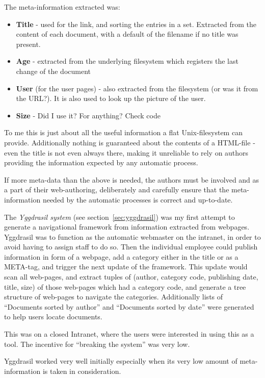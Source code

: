 The meta-information extracted was:

\begin{itemize}
\item \textbf{Title} - used for the link, and sorting the entries in a
  set.  Extracted from the content of each document, with a default of
  the filename if no title was present.
\item \textbf{Age} - extracted from the underlying filesystem which
  registers the last change of the document
\item \textbf{User} (for the user pages) - also extracted from the
  filesystem (\textsf{or was it from the URL?}).  It is also used to
  look up the picture of the user.
\item \textbf{Size} - \textsf{Did I use it?  For anything?  Check code}
\end{itemize}

To me this is just about all the useful information a flat
Unix-filesystem can provide.  Additionally nothing is guaranteed about
the contents of a HTML-file - even the title is not even always
there, making it unreliable to rely on authors providing the
information expected by any automatic process.

If more meta-data than the above is needed, the authors must be
involved and as a part of their web-authoring, deliberately and
carefully ensure that the meta-information needed by the automatic
processes is correct and up-to-date.

The \textit{Yggdrasil system} (see section~\vref{sec:yggdrasil}) was
my first attempt to generate a navigational framework from information
extracted from webpages.  Yggdrasil was to function as the automatic
webmaster on the intranet, in order to avoid having to assign staff to
do so.  Then the individual employee could publish information in form
of a webpage, add a category either in the title or as a META-tag, and
trigger the next update of the framework.  This update would scan all
web-pages, and extract tuples of (author, category code, publishing
date, title, size) of those web-pages which had a category code, and
generate a tree structure of web-pages to navigate the categories.
Additionally lists of ``Documents sorted by author'' and ``Documents
sorted by date'' were generated to help users locate documents.

This was on a closed Intranet, where the users were interested in
using this as a tool.  The incentive for ``breaking the system'' was
very low.

Yggdrasil worked very well initially especially when its very low
amount of meta-information is taken in consideration.

